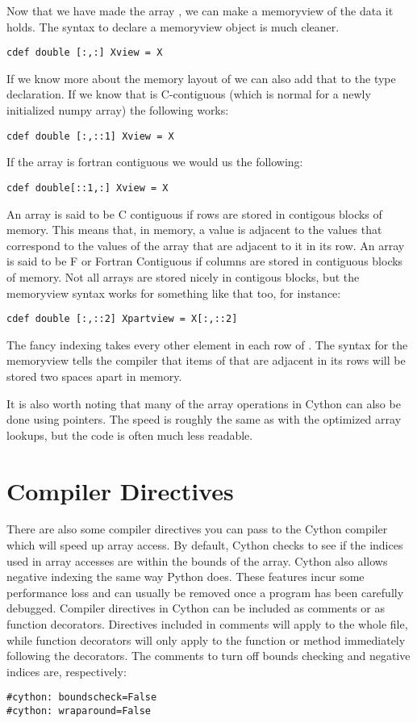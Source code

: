 Now that we have made the array , we can make a memoryview of the data it holds.
The syntax to declare a memoryview object is much cleaner.
\begin{lstlisting}
cdef double [:,:] Xview = X
\end{lstlisting}

If we know more about the memory layout of  we can also add that to the type declaration.
If we know that  is C-contiguous (which is normal for a newly initialized numpy array) the following works:

\begin{lstlisting}
cdef double [:,::1] Xview = X
\end{lstlisting}

If the array is fortran contiguous we would us the following:

\begin{lstlisting}
cdef double[::1,:] Xview = X
\end{lstlisting}

An array is said to be C contiguous if rows are stored in contigous blocks of memory.
This means that, in memory, a value is adjacent to the values that correspond to the values of the array that are adjacent to it in its row.
An array is said to be F or Fortran Contiguous if columns are stored in contiguous blocks of memory.
Not all arrays are stored nicely in contigous blocks, but the memoryview syntax works for something like that too, for instance:
\begin{lstlisting}
cdef double [:,::2] Xpartview = X[:,::2]
\end{lstlisting}

The fancy indexing takes every other element in each row of .
The syntax for the memoryview tells the compiler that items of  that are adjacent in its rows will be stored two spaces apart in memory.

It is also worth noting that many of the array operations in Cython can also be done using pointers.
The speed is roughly the same as with the optimized array lookups, but the code is often much less readable.

\section*{Compiler Directives}

There are also some compiler directives you can pass to the Cython compiler which will speed up array access.
By default, Cython checks to see if the indices used in array accesses are within the bounds of the array.
Cython also allows negative indexing the same way Python does.
These features incur some performance loss and can usually be removed once a program has been carefully debugged.
Compiler directives in Cython can be included as comments or as function decorators.
Directives included in comments will apply to the whole file, while function decorators will only apply to the function or method immediately following the decorators.
The comments to turn off bounds checking and negative indices are, respectively:
\begin{lstlisting}
#cython: boundscheck=False
#cython: wraparound=False
\end{lstlisting}

